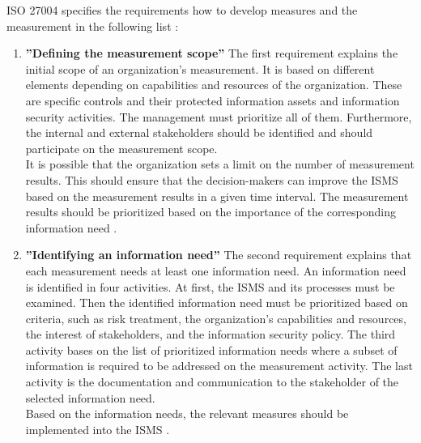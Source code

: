 ISO 27004 specifies the requirements how to develop measures and the measurement in the following list \cite{ISO_27004_2009}:

\begin{enumerate}[label=(\alph*)]
  \item \label{itm:a} \textbf{''Defining the measurement scope''}
  The first requirement explains the initial scope of an organization's measurement. It is based on different elements depending on capabilities and resources of the organization. These are specific controls and their protected information assets and information security activities. The management must prioritize all of them. Furthermore, the internal and external stakeholders should be identified and should participate on the measurement scope. \\
  It is possible that the organization sets a limit on the number of measurement results. This should ensure that the decision-makers can improve the ISMS based on the measurement results in a given time interval. The measurement results should be prioritized based on the importance of the corresponding information need \cite{ISO_27004_2009}. \\

  \item \label{itm:b} \textbf{''Identifying an information need''}
  The second requirement explains that each measurement needs at least one information need. An information need is identified in four activities. At first, the ISMS and its processes must be examined. Then the identified information need must be prioritized based on criteria, such as risk treatment, the organization's capabilities and resources, the interest of stakeholders, and the information security policy. The third activity bases on the list of prioritized information needs where a subset of information is required to be addressed on the measurement activity. The last activity is the documentation and communication to the stakeholder of the selected information need. \\
  Based on the information needs, the relevant measures should be implemented into the ISMS \cite{ISO_27004_2009}. \\


\end{enumerate}
